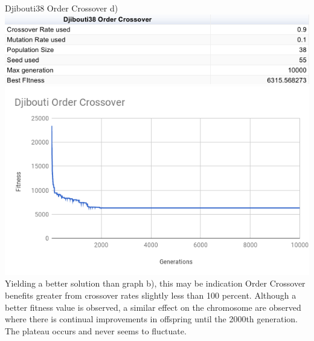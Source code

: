 \documentclass[conference]{IEEEtran}
\begin{document}
Djibouti38 Order Crossover d)
\includegraphics[scale=0.42]{Djibouti38/OC/Djibouti38_OC_d)_table}
\includegraphics[scale=0.42]{Djibouti38/OC/Djibouti38_OC_d)}
Yielding a better solution than graph b), this may be indication Order Crossover benefits greater from crossover rates slightly less than 100 percent. Although a better fitness value is observed, a similar effect on the chromosome are observed where there is continual improvements in offspring until the 2000th generation. The plateau occurs and never seems to fluctuate.\\
\end{document}

